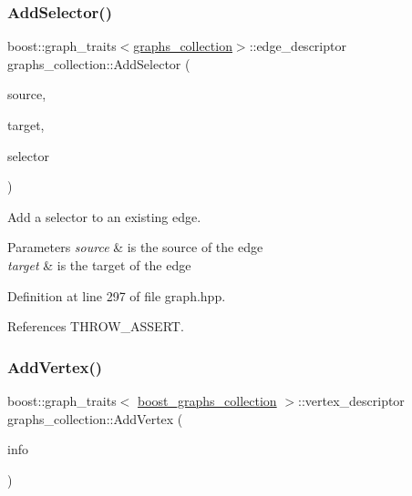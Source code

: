 \subsubsection{\texorpdfstring{Add\+Selector()}{AddSelector()}\hspace{0.1cm}{\footnotesize\ttfamily [2/2]}}
{\footnotesize\ttfamily boost\+::graph\+\_\+traits$<$\hyperlink{structgraphs__collection}{graphs\+\_\+collection}$>$\+::edge\+\_\+descriptor graphs\+\_\+collection\+::\+Add\+Selector (\begin{DoxyParamCaption}\item[{const boost\+::graph\+\_\+traits$<$ \hyperlink{structgraphs__collection}{graphs\+\_\+collection} $>$\+::vertex\+\_\+descriptor}]{source,  }\item[{const boost\+::graph\+\_\+traits$<$ \hyperlink{structgraphs__collection}{graphs\+\_\+collection} $>$\+::vertex\+\_\+descriptor}]{target,  }\item[{const int}]{selector }\end{DoxyParamCaption})\hspace{0.3cm}{\ttfamily [inline]}}



Add a selector to an existing edge. 


\begin{DoxyParams}{Parameters}
{\em source} & is the source of the edge \\
\hline
{\em target} & is the target of the edge \\
\hline
\end{DoxyParams}


Definition at line 297 of file graph.\+hpp.



References T\+H\+R\+O\+W\+\_\+\+A\+S\+S\+E\+RT.

\mbox{\label{structgraphs__collection_ad0c9e75687200d3de0cb4a7c0880042c}} 
\subsubsection{\texorpdfstring{Add\+Vertex()}{AddVertex()}}
{\footnotesize\ttfamily boost\+::graph\+\_\+traits$<$ \hyperlink{graph_8hpp_a315f0e4c95fedf30b91945ed29d42332}{boost\+\_\+graphs\+\_\+collection} $>$\+::vertex\+\_\+descriptor graphs\+\_\+collection\+::\+Add\+Vertex (\begin{DoxyParamCaption}\item[{const \hyperlink{node__info_8hpp_a345f052eed4efe04f7848fd0ebd015b2}{Node\+Info\+Ref}}]{info }\end{DoxyParamCaption})\hspace{0.3cm}{\ttfamily [virtual]}}



